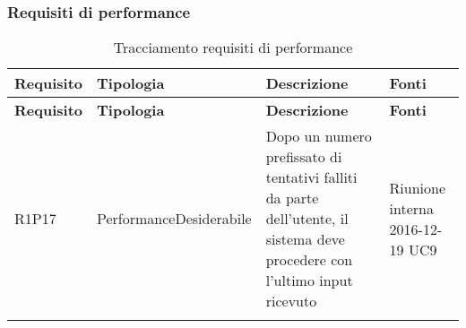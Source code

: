 \documentclass[../AnalisiDeiRequisiti.tex]{subfiles}
\begin{document}
	\subsubsection{Requisiti di performance}
	\def\arraystretch{1.5}
	\begin{longtable}{p{2cm}!{\VRule[1pt]}p{2.5cm}!{\VRule[1pt]}p{5cm}!{\VRule[1pt]}p{2.5cm}}
		\color{white} \textbf{Requisito} & \color{white} \textbf{Tipologia} & \color{white} \textbf{Descrizione} & \color{white} \textbf{Fonti} \\ 
		\endfirsthead 
		\color{white} \textbf{Requisito} & \color{white} \textbf{Tipologia} & \color{white} \textbf{Descrizione} & \color{white} \textbf{Fonti} \\ 
		\endhead 
		R1P17&Performance\newline Desiderabile & Dopo un numero prefissato di tentativi falliti da parte dell'utente, il sistema deve procedere con l'ultimo input ricevuto & Riunione interna 2016-12-19 \newline UC9
		\\
		\caption{Tracciamento requisiti di performance}
	\end{longtable}

	\newpage
\end{document}
